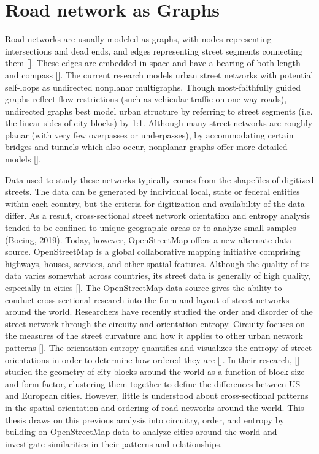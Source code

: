 \section{Road network as Graphs}
Road networks are usually modeled as graphs, with nodes representing intersections and dead ends, and edges representing street segments connecting them [\cite{Barthelemy:2008, Cardillo:2006, Lin:2013, Marshall:2018, Porta:2006}]. These edges are embedded in space and have a bearing of both length and compass [\cite{Barthelemy:2011}]. The current research models urban street networks with potential  self-loops as undirected nonplanar multigraphs. Though most-faithfully guided graphs reflect flow restrictions (such as vehicular traffic on one-way roads), undirected graphs best model urban structure by referring to street segments (i.e. the linear sides of city blocks) by 1:1. Although many street networks are roughly planar (with very few overpasses or underpasses), by accommodating certain bridges and tunnels which also occur, nonplanar graphs offer more detailed models [\cite{Boeing:2018, Eppstein:2008}].

Data used to study these networks typically comes from the shapefiles of digitized streets. The data can be generated by individual local, state or federal entities within each country, but the criteria for digitization and availability of the data differ. As a result, cross-sectional street network orientation and entropy analysis tended to be confined to unique geographic areas or to analyze small samples (Boeing, 2019). Today, however, OpenStreetMap offers a new alternate data source. OpenStreetMap is a global collaborative mapping initiative comprising highways, houses, services, and other spatial features. Although the quality of its data varies somewhat across countries, its street data is generally of high quality,  especially in cities [\cite{Barrington-Leigh:2017, Barron:2014, Zielstra:2013}]. The OpenStreetMap data source gives the ability to conduct cross-sectional research into the form and layout of street networks around the world. Researchers have recently studied the order and disorder of the street network through the  circuity and orientation entropy. Circuity focuses on the measures of the street curvature and how it applies to other urban network patterns [\cite{Boeing:2019, Giacomin:2015, Levinson:2009}]. The orientation entropy quantifies and visualizes the entropy of street orientations in order to determine how ordered they are [\cite{Courtat:2011, Gudmundsson:2013, Mohajeri:2013, Mohajeri:2013:1, Mohajeri:2014, Mohajeri:2012}]. In their research, [\cite{Louf:2014}] studied the geometry of city blocks around the world as a function of block size and form factor, clustering them together to define the differences between US and European cities. However, little is understood about cross-sectional patterns in the spatial orientation and ordering of road networks around the world. This thesis draws on this previous analysis into circuitry, order, and entropy by building on OpenStreetMap data to analyze cities around the world and investigate similarities in their patterns and relationships.

